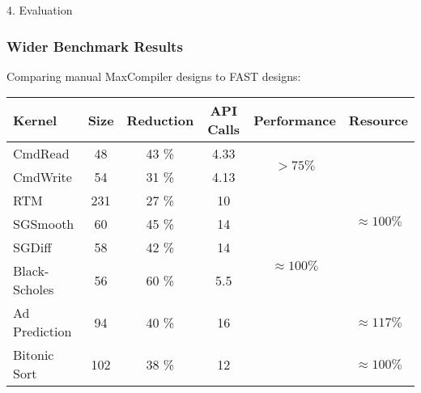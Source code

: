 \begin{frame}{4. Evaluation}
  \frametitle{Wider Benchmark Results}
  Comparing manual MaxCompiler designs to FAST designs:
  {\footnotesize
    \begin{table}
      \renewcommand{\arraystretch}{1.5}
      \begin{tabular}{l|c|c|c|c|c}
        \textbf{Kernel} & \textbf{Size} & \textbf{Reduction} & \textbf{API Calls} & \textbf{Performance}              & \textbf{Resource}
        \\
        \hline\hline
        CmdRead       & 48 & 43 \%               & 4.33                     & \multirow{2}{1.5cm}{$ > 75\%$}        & \multirow{6}{1.5cm}{$\approx 100\%$} \\
        CmdWrite      & 54  & 31 \%              & 4.13                     &                                   &                              \\
        \cline{1-4}
        RTM            & 231 & 27 \%              & 10                       & \multirow{5}{1.5cm}{$ \approx 100\%$} &                              \\
        SGSmooth      & 60 & 45 \%              & 14                       &                                   &                              \\
        SGDiff       & 58 & 42 \%              & 14                       &                                   &                              \\
        Black-Scholes & 56  & 60 \%               & 5.5                      &                                   &                              \\
        \cline{5-5}
        Ad Prediction & 94 & 40 \%             & 16                       &                                   &    $ \approx 117 \% $                          \\
        Bitonic Sort & 102 & 38 \%             & 12                    &                                   &    $ \approx 100 \% $                          \\
      \end{tabular}
    \end{table}}

\end{frame}